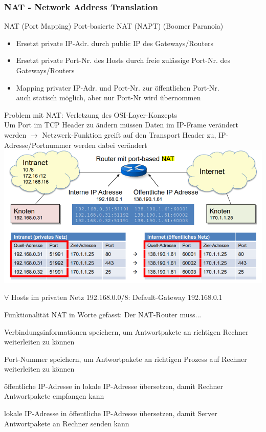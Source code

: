 \subsubsection{NAT - Network Address Translation}

\begin{definition}{NAT (Port Mapping)} Port-basierte NAT (NAPT) {\tiny (Boomer Paranoia)}    
    \begin{itemize}
        \item Ersetzt private IP-Adr. durch public IP des Gateways/Routers
        \item Ersetzt private Port-Nr. des Hosts durch freie zulässige Port-Nr. des Gateways/Routers
        \item Mapping privater IP-Adr. und Port-Nr. zur öffentlichen Port-Nr.
                \\auch statisch möglich, aber nur Port-Nr wird übernommen
    \end{itemize}
    Problem mit NAT: Verletzung des OSI-Layer-Konzepts\\
    Um Port im TCP Header zu ändern müssen Daten im IP-Frame verändert werden 
    $\rightarrow$ Netzwerk-Funktion greift auf den Transport Header zu,
    IP-Adresse/Portnummer werden dabei verändert\\
        \includegraphics[width=1\linewidth]{images/NAT.png}
\end{definition}
\begin{remark}
    $\forall$ Hosts im privaten Netz 192.168.0.0/8: Default-Gateway 192.168.0.1
\end{remark}

\begin{remark} Funktionalität NAT in Worte gefasst:
    Der NAT-Router muss...

    Verbindungsinformationen speichern, um Antwortpakete an richtigen Rechner weiterleiten zu können

  Port-Nummer speichern, um Antwortpakete an richtigen Prozess auf Rechner weiterleiten zu können

  öffentliche IP-Adresse in lokale IP-Adresse übersetzen, damit Rechner Antwortpakete empfangen kann

  lokale IP-Adresse in öffentliche IP-Adresse übersetzen, damit Server Antwortpakete an Rechner senden kann
\end{remark}

